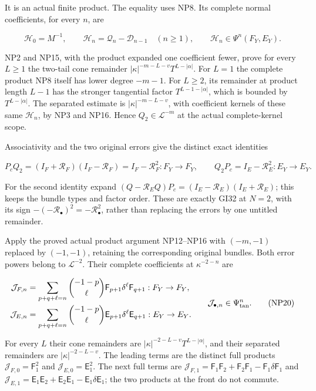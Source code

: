 \documentclass[
  11pt,
]{article}
\begin{document}
It is an actual finite product. The equality uses NP8. Its complete
normal coefficients, for every \(n\), are

\[
 \mathcal H_0=M^{-1},\qquad
 \mathcal H_n=\mathcal Q_n-\mathcal D_{n-1}\quad(n\ge1),
 \qquad \mathcal H_n\in\Psi^n(F_Y,E_Y).
 \tag{NP18}
\]

NP2 and NP15, with the product expanded one coefficient fewer, prove for
every \(L\ge1\) the two-tail cone remainder
\(|\kappa |^{-m-L-v}T^{L-|\alpha |}\). For \(L=1\) the complete product
NP8 itself has lower degree \(-m-1\). For \(L\ge2\), its remainder at
product length \(L-1\) has the stronger tangential factor
\(T^{L-1-|\alpha |}\), which is bounded by \(T^{L-|\alpha |}\). The
separated estimate is \(|\kappa |^{-m-L-v}\), with coefficient kernels
of these same \(\mathcal H _n\), by NP3 and NP16. Hence
\(Q_2\in \mathcal L ^{-m}\) at the actual complete-kernel scope.

Associativity and the two original errors give the distinct exact
identities

\[
 \boxed{\displaystyle
 P_cQ_2=(I_F+\mathcal R_F)(I_F-\mathcal R_F)
          =I_F-\mathcal R_F^2:F_Y\to F_Y,
 \qquad
 Q_2P_c=I_E-\mathcal R_E^2:E_Y\to E_Y.}
 \tag{NP19}
\]

For the second identity expand
\((Q-\mathcal R _EQ)P_c=(I_E-\mathcal R _E)(I_E+\mathcal R _E)\); this
keeps the bundle types and factor order. These are exactly GI32 at
\(N=2\), with its sign
\(-(-\mathcal R _\bullet )^2=-\mathcal R _\bullet ^2\), rather than
replacing the errors by one untitled remainder.

Apply the proved actual product argument NP12--NP16 with \((-m,-1)\)
replaced by \((-1,-1)\), retaining the corresponding original bundles.
Both error powers belong to \(\mathcal L ^{-2}\). Their complete
coefficients at \(\kappa ^{-2-n}\) are

\[
 \begin{aligned}
 \mathcal J_{F,n}&=
   \sum_{p+q+\ell=n}
       \binom{-1-p}{\ell}\mathsf F_{p+1}\delta^\ell\mathsf F_{q+1}
       :F_Y\to F_Y,\\
 \mathcal J_{E,n}&=
   \sum_{p+q+\ell=n}
       \binom{-1-p}{\ell}\mathsf E_{p+1}\delta^\ell\mathsf E_{q+1}
       :E_Y\to E_Y.
 \end{aligned}
 \qquad
 \mathcal J_{\bullet,n}\in\Psi_{\rm tan}^{n}.
 \tag{NP20}
\]

For every \(L\) their cone remainders are
\(|\kappa |^{-2-L-v}T^{L-|\alpha |}\), and their separated remainders
are \(|\kappa |^{-2-L-v}\). The leading terms are the distinct full
products \(\mathcal J _{F,0}=\mathsf F _1^2\) and
\(\mathcal J _{E,0}=\mathsf E _1^2\). The next full terms are
\(\mathcal J _{F,1}=\mathsf F _1\mathsf F _2+\mathsf F _2\mathsf F _1-\mathsf F _1\delta \mathsf F _1\)
and
\(\mathcal J _{E,1}=\mathsf E _1\mathsf E _2+\mathsf E _2\mathsf E _1-\mathsf E _1\delta \mathsf E _1\);
the two products at the front do not commute.
\end{document}
